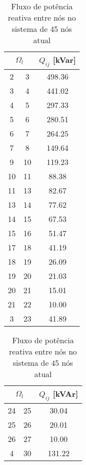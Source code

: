 \begin{table}[H]\footnotesize
    \caption{Fluxo de potência reativa entre nós no sistema de 45 nós atual}
    \label{tab:fluxo_kvar_atual}
    \begin{minipage}{.5\linewidth}
        \centering
        \begin{tabular}{|c|c|c|}
            \hline
            \multicolumn{2}{|c|}{$\Omega_l$} & $Q_{ij}$ [kVar]  \\ \hline
             2  &  3 &  498.36\\ \hline
             3  &  4 &  441.02\\ \hline
             4  &  5 &  297.33\\ \hline
             5  &  6 &  280.51\\ \hline
             6  &  7 &  264.25\\ \hline
             7  &  8 &  149.64\\ \hline
             9  & 10 &  119.23\\ \hline
            10  & 11 &   88.38\\ \hline
            11  & 13 &   82.67\\ \hline
            13  & 14 &   77.62\\ \hline
            14  & 15 &   67.53\\ \hline
            15  & 16 &   51.47\\ \hline
            17  & 18 &   41.19\\ \hline
            18  & 19 &   26.09\\ \hline
            19  & 20 &   21.03\\ \hline
            20  & 21 &   15.01\\ \hline
            21  & 22 &   10.00\\ \hline
             3  & 23 &   41.89\\ \hline
        \end{tabular}
    \end{minipage}%
    \begin{minipage}{.5\linewidth}
        \centering
        \begin{tabular}{|c|c|c|}
            \hline
            \multicolumn{2}{|c|}{$\Omega_l$} & $Q_{ij}$ [kVAr]  \\ 
            \hline
            24 &  25 &    30.04\\ \hline
            25 &  26 &    20.01\\ \hline
            26 &  27 &    10.00\\ \hline
             4 &  30 &   131.22\\ \hline

\end{tabular}
\end{minipage}
\end{table}
